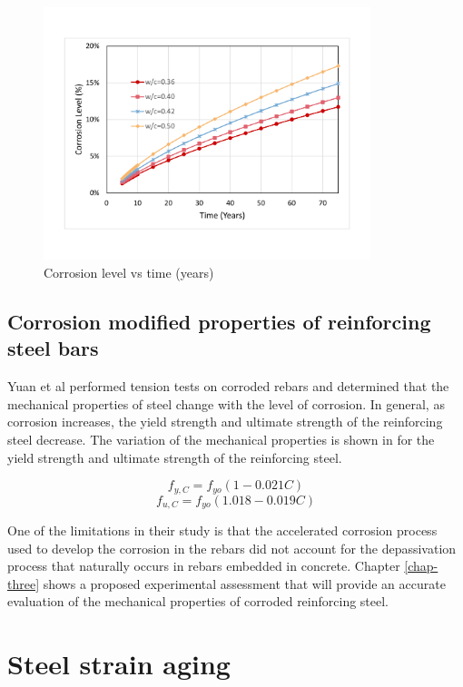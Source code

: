 \begin{figure}[htbp]
\centering
\includegraphics[width=0.85\textwidth]{Chapter-2/figs/CorrosionLevel}
\caption{Corrosion level vs time (years)}
\label{fig:CorrosionLevel_Time}
\end{figure}

\subsection{Corrosion modified properties of reinforcing steel bars}

Yuan et al \cite{Yuan2017a} performed tension tests on corroded rebars and determined that the mechanical properties of steel change with the level of corrosion. In general, as corrosion increases, the yield strength and ultimate strength of the reinforcing steel decrease.  The variation of the mechanical properties is shown in  for the yield strength and ultimate strength of the reinforcing steel.

\begin{equation}
  f_{y,C}=f_{yo}(1-0.021C)
  \label{eq.eleven}
\end{equation} 
\[
  f_{u,C}=f_{yo}(1.018-0.019C)
\]

One of the limitations in their study is that the accelerated corrosion process used to develop the corrosion in the rebars did not account for the depassivation process that naturally occurs in rebars embedded in concrete. Chapter \ref{chap-three} shows a proposed experimental assessment that will provide an accurate evaluation of the mechanical properties of corroded reinforcing steel. 

\section{Steel strain aging}


